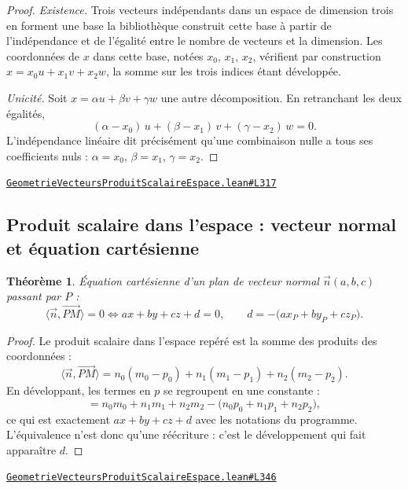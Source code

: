 \documentclass[11pt,a4paper]{article}
\theoremstyle{definition}
\theoremstyle{plain}
\newtheorem{theoreme}{Théorème}
\newcommand{\source}[2]{\par\smallskip\noindent\hfill{\footnotesize\href{#1}{\texttt{#2}}}\par\smallskip}
\begin{document}
\begin{proof}
\emph{Existence.} Trois vecteurs indépendants dans un espace de dimension trois en forment
une base \textemdash{} la bibliothèque construit cette base à partir de l'indépendance et
de l'égalité entre le nombre de vecteurs et la dimension. Les coordonnées de $x$ dans cette
base, notées $x_0$, $x_1$, $x_2$, vérifient par construction
$x = x_0 u + x_1 v + x_2 w$, la somme sur les trois indices étant développée.

\emph{Unicité.} Soit $x = \alpha u + \beta v + \gamma w$ une autre décomposition. En
retranchant les deux égalités,
\[ (\alpha - x_0)\,u + (\beta - x_1)\,v + (\gamma - x_2)\,w = 0 . \]
L'indépendance linéaire dit précisément qu'une combinaison nulle a tous ses coefficients
nuls : $\alpha = x_0$, $\beta = x_1$, $\gamma = x_2$.
\end{proof}
\source{https://github.com/Commutator-IO/learn-lean/blob/main/courses/02-lycee/08-geometrie-vecteurs-produit-scalaire-espace/GeometrieVecteursProduitScalaireEspace.lean\#L317}{GeometrieVecteursProduitScalaireEspace.lean\#L317}

\subsection{Produit scalaire dans l'espace : vecteur normal et équation cartésienne}

\begin{theoreme}
Équation cartésienne d'un plan de vecteur normal $\vec n(a, b, c)$ passant par $P$ :
\[ \langle \vec n, \overrightarrow{PM}\rangle = 0
   \iff a x + b y + c z + d = 0 ,
   \qquad d = -\bigl(a x_P + b y_P + c z_P\bigr) . \]
\end{theoreme}

\begin{proof}
Le produit scalaire dans l'espace repéré est la somme des produits des coordonnées :
\[ \langle \vec n, \overrightarrow{PM}\rangle
   = n_0 (m_0 - p_0) + n_1 (m_1 - p_1) + n_2 (m_2 - p_2) . \]
En développant, les termes en $p$ se regroupent en une constante :
\[ = n_0 m_0 + n_1 m_1 + n_2 m_2 - \bigl(n_0 p_0 + n_1 p_1 + n_2 p_2\bigr) , \]
ce qui est exactement $ax + by + cz + d$ avec les notations du programme. L'équivalence
n'est donc qu'une réécriture : c'est le développement qui fait apparaître $d$.
\end{proof}
\source{https://github.com/Commutator-IO/learn-lean/blob/main/courses/02-lycee/08-geometrie-vecteurs-produit-scalaire-espace/GeometrieVecteursProduitScalaireEspace.lean\#L346}{GeometrieVecteursProduitScalaireEspace.lean\#L346}
\end{document}
